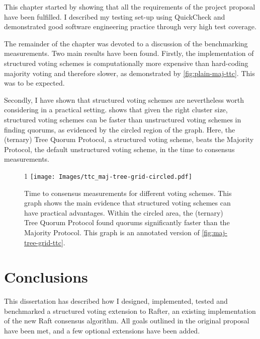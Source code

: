 \documentclass[12pt,chapterprefix=true,toc=bibliography,numbers=noendperiod,
               footnotes=multiple,twoside]{scrreprt}
\begin{document}
This chapter started by showing that all the requirements of the project proposal have been fulfilled. I described my testing set-up using QuickCheck and demonstrated good software engineering practice through very high test coverage.

The remainder of the chapter was devoted to a discussion of the benchmarking measurements. Two main results have been found. Firstly, the implementation of structured voting schemes is computationally more expensive than hard-coding majority voting and therefore slower, as demonstrated by \cref{fig:plain-maj-ttc}. This was to be expected.

Secondly, I have shown that structured voting schemes are nevertheless worth considering in a practical setting.  shows that given the right cluster size, structured voting schemes can be faster than unstructured voting schemes in finding quorums, as evidenced by the circled region of the graph. Here, the (ternary) Tree Quorum Protocol, a structured voting scheme, beats the Majority Protocol, the default unstructured voting scheme, in the time to consensus measurements.

\begin{figure}{1\textwidth}
    \centering
    \texttt{[image: Images/ttc\_maj-tree-grid-circled.pdf]}
    \caption{Time to consensus measurements for different voting schemes. This graph shows the main evidence that structured voting schemes can have practical advantages. Within the circled area, the (ternary) Tree Quorum Protocol found quorums significantly faster than the Majority Protocol. This graph is an annotated version of \cref{fig:maj-tree-grid-ttc}.}
    \label{fig:maj-tree-grid-ttc-circled}
\end{figure}



\chapter{Conclusions}
\label{ch:conclusions}


This dissertation has described how I designed, implemented, tested and benchmarked a structured voting extension to Rafter, an existing implementation of the new Raft consensus algorithm. All goals outlined in the original proposal have been met, and a few optional extensions have been added.
\end{document}
